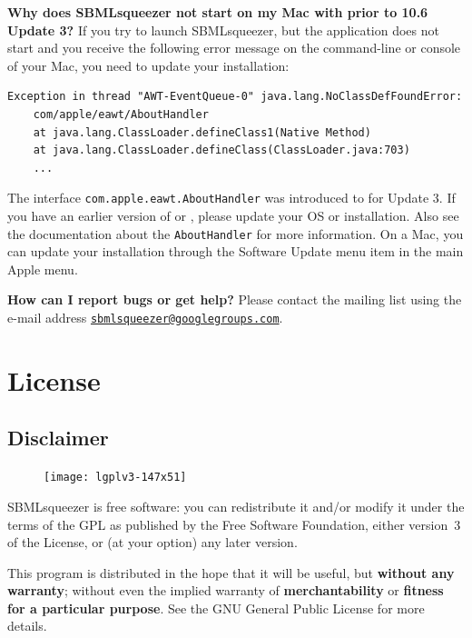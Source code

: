 \noindent \textbf{Why does SBMLsqueezer not start on my Mac with \MacOSX prior to 10.6 Update 3?}\newline
If you try to launch SBMLsqueezer, but the application does not start and you receive the following error message on the command-line or \Java console of your Mac, you need to update your \Java installation:
\begin{verbatim}
Exception in thread "AWT-EventQueue-0" java.lang.NoClassDefFoundError:
    com/apple/eawt/AboutHandler
    at java.lang.ClassLoader.defineClass1(Native Method)
    at java.lang.ClassLoader.defineClass(ClassLoader.java:703)
    ...
\end{verbatim}
The interface \texttt{com.apple.eawt.AboutHandler} was introduced to \Java for  Update 3. If you have an earlier version of \MacOSX or \Java, please update your OS or \Java installation.
Also see the \MacOSX documentation about the \texttt{AboutHandler} for more information. On a Mac, you can update your \Java installation through the Software Update menu item in the main Apple menu.
\newline

\noindent \textbf{How can I report bugs or get help?}\newline
Please contact the mailing list using the e-mail address 
\href{mailto:sbmlsqueezer@googlegroups.com}{\texttt{sbmlsqueezer@google\-groups.com}}.

\chapter{License}

\section{Disclaimer}
\begin{figure}
\vspace{\wrapfigspace}
\texttt{[image: lgplv3-147x51]}
\end{figure}
SBMLsqueezer is free software: you can redistribute it and/or modify
it under the terms of the \acf{GPL} as published by
the Free Software Foundation, either version~3 of the License, or
(at your option) any later version.

This program is distributed in the hope that it will be useful,
but \textbf{without any warranty}; without even the implied warranty of
\textbf{merchantability} or \textbf{fitness for a particular purpose}. See the
GNU General Public License for more details.

